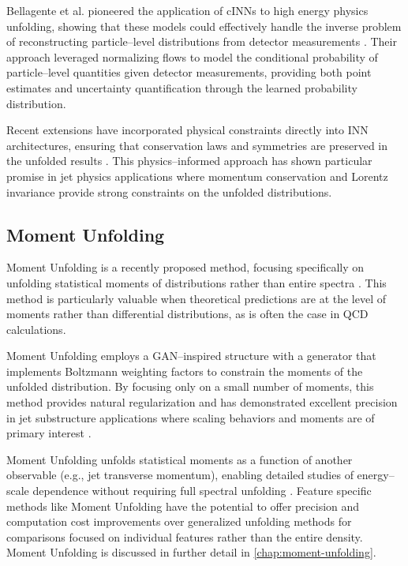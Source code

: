     Bellagente et al. pioneered the application of cINNs to high energy physics unfolding, showing that these models could effectively handle the inverse problem of reconstructing particle--level distributions from detector measurements .
    Their approach leveraged normalizing flows to model the conditional probability of particle--level quantities given detector measurements, providing both point estimates and uncertainty quantification through the learned probability distribution.

    Recent extensions have incorporated physical constraints directly into INN architectures, ensuring that conservation laws and symmetries are preserved in the unfolded results .
    This physics--informed approach has shown particular promise in jet physics applications where momentum conservation and Lorentz invariance provide strong constraints on the unfolded distributions.

    \subsection{Moment Unfolding}
    Moment Unfolding is a recently proposed method, focusing specifically on unfolding statistical moments of distributions rather than entire spectra .
    This method is particularly valuable when theoretical predictions are at the level of moments rather than differential distributions, as is often the case in QCD calculations.

    Moment Unfolding employs a GAN--inspired structure with a generator that implements Boltzmann weighting factors to constrain the moments of the unfolded distribution.
    By focusing only on a small number of moments, this method provides natural regularization and has demonstrated excellent precision in jet substructure applications where scaling behaviors and moments are of primary interest .

     Moment Unfolding unfolds statistical moments as a function of another observable (e.g., jet transverse momentum), enabling detailed studies of energy--scale dependence without requiring full spectral unfolding .
     Feature specific methods like Moment Unfolding have the potential to offer precision and computation cost improvements over generalized unfolding methods for comparisons focused on individual features rather than the entire density.
     Moment Unfolding is discussed in further detail in \cref{chap:moment-unfolding}.

